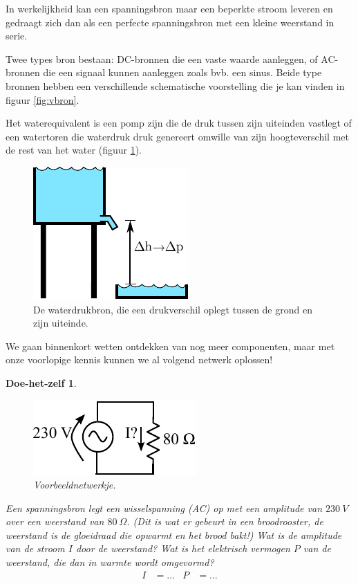 \documentclass{article}
\newtheorem{DIY}{Doe-het-zelf}
\begin{document}
			 In werkelijkheid kan een spanningsbron maar een beperkte stroom leveren en gedraagt zich dan als een perfecte spanningsbron met een kleine weerstand in serie. 
			 
			 Twee types bron bestaan: DC-bronnen die een vaste waarde aanleggen, of AC-bronnen die een signaal kunnen aanleggen zoals bvb. een sinus. Beide type bronnen hebben een verschillende schematische voorstelling die je kan vinden in figuur \ref{fig:vbron}.

			 Het waterequivalent is een pomp zijn die de druk tussen zijn uiteinden vastlegt of een watertoren die waterdruk druk genereert omwille van zijn hoogteverschil met de rest van het water (figuur \ref{fig:waterbron}).

		\begin{figure}[htbp]
				\centering
				\includegraphics{waterbron}
				\caption{De waterdrukbron, die een drukverschil oplegt tussen de grond en zijn uiteinde.}
				\label{fig:waterbron}
			\end{figure}

			We gaan binnenkort wetten ontdekken van nog meer componenten, maar met onze voorlopige kennis kunnen we al volgend netwerk oplossen!

		
			\begin{DIY} 
			\begin{figure}[h!]
				\centering
				\includegraphics{vbweerstand.pdf}
				\caption{Voorbeeldnetwerkje.}
				\label{fig:vbweerstand}
			\end{figure}
			Een spanningsbron legt een wisselspanning (AC) op met een amplitude van $230~V$ over een weerstand van $80~\Omega$. (Dit is wat er gebeurt in een broodrooster, de weerstand is de gloeidraad die opwarmt en het brood bakt!) Wat is de amplitude van de  stroom $I$ door de weerstand? Wat is het elektrisch vermogen $P$ van de weerstand, die dan in warmte wordt omgevormd?
			\begin{align}
			    I&= \ldots & P&= \ldots 
			\end{align}
			\end{DIY}
\end{document}
